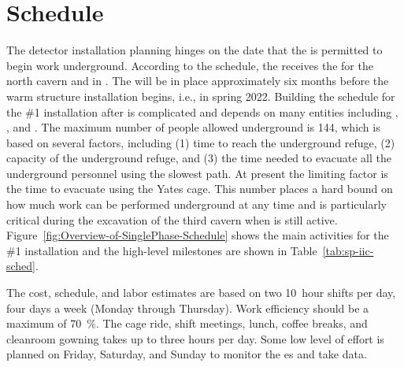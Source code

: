 \section{Schedule}
\label{sec:sp-inst-sched}

The detector installation planning hinges on the date that the  is permitted to begin work underground. According to the   schedule, the  receives the  for  the north cavern and  in \cucbenocc{}.  The   will be in place approximately six months before the warm structure installation begins, i.e., in spring 2022. Building the schedule for the  \#1 installation after  is  complicated and depends on many entities including , , and .  The maximum number of people allowed underground is 144, which 
is based on several factors, including (1) time to reach the underground refuge, (2) capacity of the underground refuge, and (3) the time needed to evacuate all the underground personnel using the slowest path. At present the limiting factor is the time to evacuate using  the Yates cage. 
This number places a hard bound on how much work can be performed underground at any time and is particularly critical during the excavation of the third cavern when  is still active. Figure~\ref{fig:Overview-of-SinglePhase-Schedule} shows the main activities for the  \#1 installation and  the high-level milestones are shown in Table~\ref{tab:sp-iic-sched}.

The cost, schedule, and labor estimates are based on two \SI{10}{hour} shifts per day, four days a week (Monday through Thursday). Work efficiency should be a maximum of \SI{70}{\%}.  The cage ride, shift meetings, lunch, coffee breaks, and cleanroom gowning takes %
up to three hours per day. Some low level of effort is planned on Friday, Saturday, and Sunday to monitor the \coldbox{}es and take data. 



